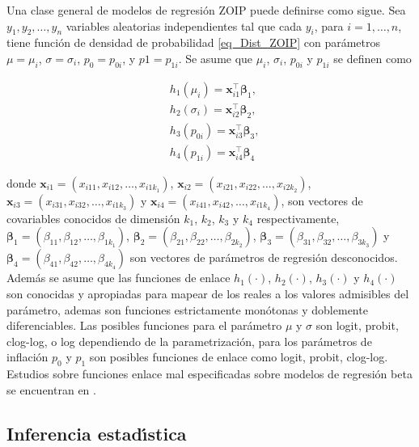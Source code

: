 Una clase general de modelos de regresi\'{o}n ZOIP puede definirse como sigue. Sea $y_1, y_2,\ldots, y_n$ variables aleatorias independientes tal que cada $y_i$, para $i=1,\ldots, n$, tiene funci\'{o}n de densidad de probabilidad \eqref{eq_Dist_ZOIP} con par\'{a}metros $\mu = \mu_i$, $\sigma=\sigma_i$,  $p_0=p_{0i}$, y $p1=p_{1i}$. Se asume que $\mu_i$, $\sigma_i$, $p_{0i}$ y $p_{1i}$ se definen como

\begin{equation}
\begin{split}
&h_1(\mu_{i})=\mathbf{x}_{i1}^{\top} \boldsymbol{\beta}_1,\\
&h_2(\sigma_{i})=\mathbf{x}_{i2}^{\top} \boldsymbol{\beta}_2,\\
&h_3(p_{0i})=\mathbf{x}_{i3}^{\top} \boldsymbol{\beta}_3,\\
&h_4(p_{1i}) =\mathbf{x}_{i4}^{\top} \boldsymbol{\beta}_4
\end{split}
\label{eq_reg}
\end{equation}

donde $\mathbf{x}_{i1}=(x_{i11}, x_{i12},\ldots, x_{i1k_1})$, $\mathbf{x}_{i2}=(x_{i21}, x_{i22},\ldots, x_{i2k_2})$, \\
$\mathbf{x}_{i3}=(x_{i31}, x_{i32},\ldots, x_{i1k_3})$ y $\mathbf{x}_{i4}=(x_{i41}, x_{i42},\ldots, x_{i1k_4})$, son vectores de covariables conocidos de dimensi\'{o}n $k_1$, $k_2$, $k_3$ y $k_4$ respectivamente, $\boldsymbol{\beta}_1=(\beta_{11}, \beta_{12},\ldots, \beta_{1k_1})$, $\boldsymbol{\beta}_2=(\beta_{21}, \beta_{22},\ldots, \beta_{2k_2})$, $\boldsymbol{\beta}_3=(\beta_{31}, \beta_{32},\ldots, \beta_{3k_3})$ y $\boldsymbol{\beta}_4=(\beta_{41}, \beta_{42},\ldots, \beta_{4k_4})$ son vectores de par\'{a}metros de regresi\'{o}n desconocidos. Adem\'{a}s se asume que las funciones de enlace $h_1(\cdot)$, $h_2(\cdot)$, $h_3(\cdot)$ y $h_4(\cdot)$ son conocidas y apropiadas para mapear de los reales a los valores admisibles del par\'{a}metro, ademas son funciones estrictamente mon\'{o}tonas y doblemente diferenciables. Las posibles funciones para el par\'{a}metro $\mu$ y $\sigma$ son logit, probit, clog-log, o log dependiendo de la parametrizaci\'{o}n,  para los par\'{a}metros de inflaci\'{o}n $p_0$ y $p_1$ son posibles funciones de enlace como logit, probit, clog-log. Estudios sobre funciones enlace mal especificadas sobre modelos de regresi\'{o}n beta se encuentran en \cite{andrade07}.

\subsection{Inferencia estad\'{\i}stica}

